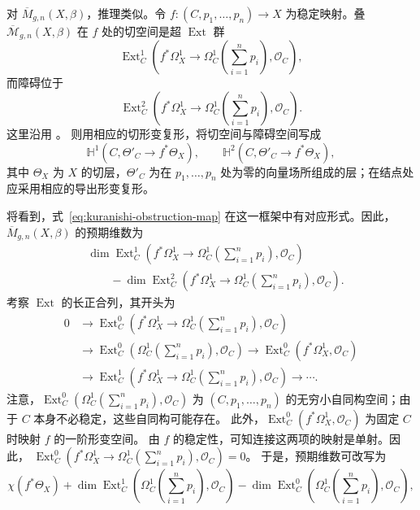 对 $\overline M_{g,n}(X,\beta)$，推理类似。令 $f:(C,p_1,\ldots,p_n)\to X$ 为稳定映射。叠
$\overline{\mathcal M}_{g,n}(X,\beta)$ 在 $f$ 处的切空间是超 $\operatorname{Ext}$ 群
\[
\operatorname{Ext}_C^1
\left(f^*\Omega_X^1\longrightarrow\Omega_C^1\left(\sum_{i=1}^np_i\right),
\mathcal O_C\right),
\]
而障碍位于
\[
\operatorname{Ext}_C^2
\left(f^*\Omega_X^1\longrightarrow\Omega_C^1\left(\sum_{i=1}^np_i\right),
\mathcal O_C\right).
\]
这里沿用 。 则用相应的切形变复形，将切空间与障碍空间写成
\[
\mathbb H^1(C,\Theta'_C\longrightarrow f^*\Theta_X),
\qquad
\mathbb H^2(C,\Theta'_C\longrightarrow f^*\Theta_X),
\]
其中 $\Theta_X$ 为 $X$ 的切层，$\Theta'_C$ 为在 $p_1,\ldots,p_n$ 处为零的向量场所组成的层；在结点处应采用相应的导出形变复形。

将看到，式~\eqref{eq:kuranishi-obstruction-map} 在这一框架中有对应形式。因此，
$\overline M_{g,n}(X,\beta)$ 的预期维数为
\[
\begin{aligned}
&\dim\operatorname{Ext}_C^1
\left(f^*\Omega_X^1\to\Omega_C^1\left(\sum_{i=1}^np_i\right),\mathcal O_C\right)\\
&\qquad-\dim\operatorname{Ext}_C^2
\left(f^*\Omega_X^1\to\Omega_C^1\left(\sum_{i=1}^np_i\right),\mathcal O_C\right).
\end{aligned}
\]
考察 $\operatorname{Ext}$ 的长正合列，其开头为
\begin{equation}\label{eq:stable-map-ext-sequence}
\begin{aligned}
0&\longrightarrow
\operatorname{Ext}_C^0
\left(f^*\Omega_X^1\to\Omega_C^1\left(\sum_{i=1}^np_i\right),\mathcal O_C\right)\\
&\longrightarrow\operatorname{Ext}_C^0
\left(\Omega_C^1\left(\sum_{i=1}^np_i\right),\mathcal O_C\right)
\longrightarrow\operatorname{Ext}_C^0(f^*\Omega_X^1,\mathcal O_C)\\
&\longrightarrow\operatorname{Ext}_C^1
\left(f^*\Omega_X^1\to\Omega_C^1\left(\sum_{i=1}^np_i\right),\mathcal O_C\right)
\longrightarrow\cdots.
\end{aligned}
\end{equation}
注意，$\operatorname{Ext}_C^0(\Omega_C^1(\sum_{i=1}^np_i),\mathcal O_C)$ 为
$(C,p_1,\ldots,p_n)$ 的无穷小自同构空间；由于 $C$ 本身不必稳定，这些自同构可能存在。
此外，$\operatorname{Ext}_C^0(f^*\Omega_X^1,\mathcal O_C)$ 为固定 $C$ 时映射 $f$ 的一阶形变空间。
由 $f$ 的稳定性，可知连接这两项的映射是单射。因此，
$\operatorname{Ext}_C^0(f^*\Omega_X^1\to\Omega_C^1(\sum_{i=1}^np_i),\mathcal O_C)=0$。
于是，预期维数可改写为
\[
\chi(f^*\Theta_X)+
\dim\operatorname{Ext}_C^1\left(\Omega_C^1\left(\sum_{i=1}^np_i\right),\mathcal O_C\right)
-\dim\operatorname{Ext}_C^0\left(\Omega_C^1\left(\sum_{i=1}^np_i\right),\mathcal O_C\right),
\]
